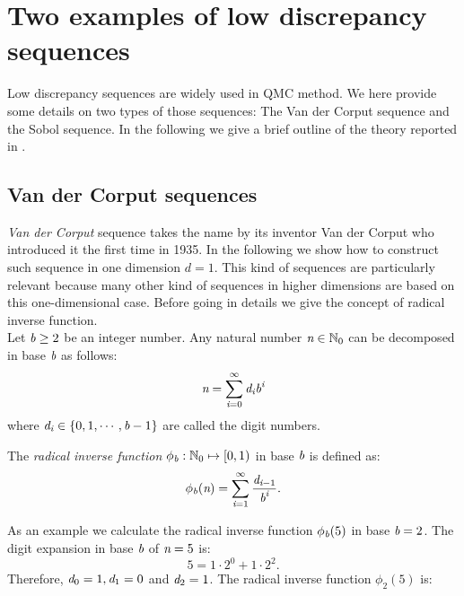 \chapter{Two examples of low discrepancy sequences}\label{app:Sobol}
Low discrepancy sequences are widely used in QMC method. We here provide some details on two types of those sequences: The Van der Corput sequence and the Sobol sequence.
In the following we give a brief outline of the theory reported in \cite{joe2008notes, leobacher2014introduction}.
\section{Van der Corput sequences}
\textit{Van der Corput} sequence takes the name by its inventor Van der Corput who introduced it the first time in 1935. In the following we show how to construct such sequence in one dimension $d=1$. This kind of sequences are particularly relevant because many other kind of sequences in higher dimensions are based on this one-dimensional case. Before going in details we give the concept of radical inverse function. \\ \indent 
Let $\textit{b}\geq 2$ be an integer number. Any natural number $\textit{n}\in \mathbb{N}_0$ can be decomposed in base $\textit{b}$ as follows:
\begin{equation}
\textit{n} = \sum_{\textit{i}=0}^\infty \textit{d}_{\textit{i}}\textit{b}^{\textit{i}}
\end{equation}
where $\textit{d}_{\textit{i}} \in \{0, 1, \cdots, \textit{b}-1\}$ are called the digit numbers.
\begin{definition}
The \textit{radical inverse function} $\phi_{\textit{b}}:\mathbb{N}_0\mapsto [0,1)$ in base $\textit{b}$ is defined as:
\begin{equation}
\phi_{\textit{b}}(\textit{n}) = \sum_{\textit{i}=1}^{\infty}\frac{\textit{d}_{\textit{i}-1}}{\textit{b}^{\textit{i}}}.
\end{equation}
\end{definition}
As an example we calculate the radical inverse function $\phi_{\textit{b}}(5)$ in base $\textit{b} = 2$. 
The digit expansion in base $\textit{b}$ of $\textit{n}=5$ is:
\begin{equation}
5 = 1\cdot 2^0+1\cdot 2^2.
\end{equation}
Therefore, $\textit{d}_0 = 1, \textit{d}_1 = 0$ and $\textit{d}_2 = 1$. 
The radical inverse function $\phi_2(5)$ is:
